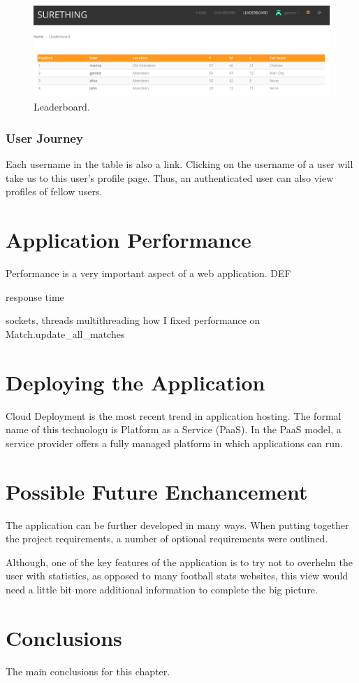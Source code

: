 \begin{figure}[H]
	\begin{center}
		\includegraphics[width=.90\textwidth]{impl/images/leaderboard}
		\caption{Leaderboard.} \label{fig:using: leaderboard}
	\end{center}
\end{figure}

\subsubsection*{User Journey}
\label{subsec:leaderboarduserjourney}
Each username in the table is also a link. Clicking on the username of a user will take us to this user's profile page. Thus, an authenticated user can also view profiles of fellow users.

\section{Application Performance}
\label{sec:applicationperformance}
Performance is a very important aspect of a web application. DEF 

response time 

sockets, threads
multithreading
how I fixed performance on Match.update\_all\_matches

\section{Deploying the Application}
Cloud Deployment is the most recent trend in application hosting. The formal name of this technologu is Platform as a Service (PaaS).  In the PaaS model, a service provider offers a fully managed platform in which applications can run.

\section{Possible Future Enchancement}
\label{sec:enchancement}
The application can be further developed in many ways.  
When putting together the project requirements, a number of optional requirements were outlined. 

Although, one of the key features of the application is to try not to overhelm the user with statistics, as opposed to many football stats websites, this view would need a little bit more additional information to complete the big picture. 

\section{Conclusions}
The main conclusions for this chapter.